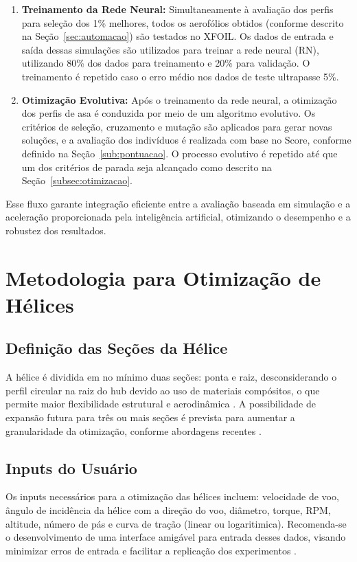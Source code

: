 \begin{enumerate}
    \item \textbf{Treinamento da Rede Neural:} Simultaneamente à avaliação dos perfis para seleção dos 1\% melhores, todos os aerofólios obtidos (conforme descrito na Seção~\ref{sec:automacao}) são testados no XFOIL. Os dados de entrada e saída dessas simulações são utilizados para treinar a rede neural (RN), utilizando 80\% dos dados para treinamento e 20\% para validação. O treinamento é repetido caso o erro médio nos dados de teste ultrapasse 5\%.
    \item \textbf{Otimização Evolutiva:} Após o treinamento da rede neural, a otimização dos perfis de asa é conduzida por meio de um algoritmo evolutivo. Os critérios de seleção, cruzamento e mutação são aplicados para gerar novas soluções, e a avaliação dos indivíduos é realizada com base no Score, conforme definido na Seção~\ref{sub:pontuacao}. O processo evolutivo é repetido até que um dos critérios de parada seja alcançado como descrito na Seção~\ref{subsec:otimizacao}.
\end{enumerate}

Esse fluxo garante integração eficiente entre a avaliação baseada em simulação e a aceleração proporcionada pela inteligência artificial, otimizando o desempenho e a robustez dos resultados.

\section{Metodologia para Otimização de Hélices}

\subsection{Definição das Seções da Hélice}
A hélice é dividida em no mínimo duas seções: ponta e raiz, desconsiderando o perfil circular na raiz do hub  devido ao uso de materiais compósitos, o que permite maior flexibilidade estrutural e aerodinâmica \cite{raymer2018aircraft}. A possibilidade de expansão futura para três ou mais seções é prevista para aumentar a granularidade da otimização, conforme abordagens recentes \cite{wu2024}.

\subsection{Inputs do Usuário}
Os inputs necessários para a otimização  das hélices incluem: velocidade de voo, ângulo de incidência da hélice com a direção do voo, diâmetro, torque, RPM, altitude, número de pás e curva de tração (linear ou logaritimica). Recomenda-se o desenvolvimento de uma interface amigável para entrada desses dados, visando minimizar erros de entrada e facilitar a replicação dos experimentos \cite{wu2024, raymer2018aircraft}.

